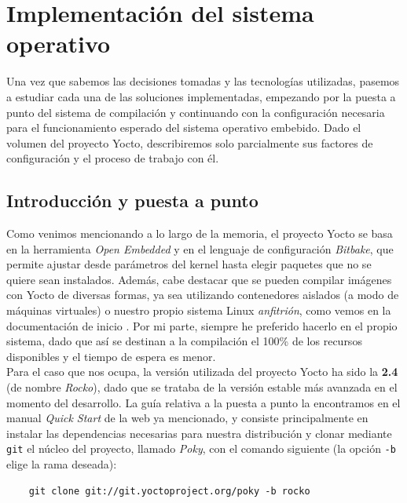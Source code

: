 \chapter{Implementación del sistema operativo}

Una vez que sabemos las decisiones tomadas y las tecnologías utilizadas, pasemos a estudiar cada una de las soluciones implementadas, empezando por la puesta a punto del sistema de compilación y continuando con la configuración necesaria para el funcionamiento esperado del sistema operativo embebido. Dado el volumen del proyecto Yocto, describiremos solo parcialmente sus factores de configuración y el proceso de trabajo con él.

\section{Introducción y puesta a punto}

Como venimos mencionando a lo largo de la memoria, el proyecto Yocto se basa en la herramienta \textit{Open Embedded} y en el lenguaje de configuración \textit{Bitbake}, que permite ajustar desde parámetros del kernel hasta elegir paquetes que no se quiere sean instalados. Además, cabe destacar que se pueden compilar imágenes con Yocto de diversas formas, ya sea utilizando contenedores aislados (a modo de máquinas virtuales) o nuestro propio sistema Linux \textit{anfitrión}, como vemos en la documentación de inicio \cite{yocto-project-quick-start-build-system}. Por mi parte, siempre he preferido hacerlo en el propio sistema, dado que así se destinan a la compilación el 100\% de los recursos disponibles y el tiempo de espera es menor.\\

Para el caso que nos ocupa, la versión utilizada del proyecto Yocto ha sido la \textbf{2.4} (de nombre \textit{Rocko}), dado que se trataba de la versión estable más avanzada en el momento del desarrollo. La guía relativa a la puesta a punto la encontramos en el manual \textit{Quick Start} de la web \cite{yocto-project-quick-start} ya mencionado, y consiste principalmente en instalar las dependencias necesarias para nuestra distribución y clonar mediante \texttt{git} el núcleo del proyecto, llamado \textit{Poky}, con el comando siguiente (la opción \texttt{-b} elige la rama deseada):

\begin{center}
	\begin{lstlisting}
	git clone git://git.yoctoproject.org/poky -b rocko
	\end{lstlisting}
\end{center}

